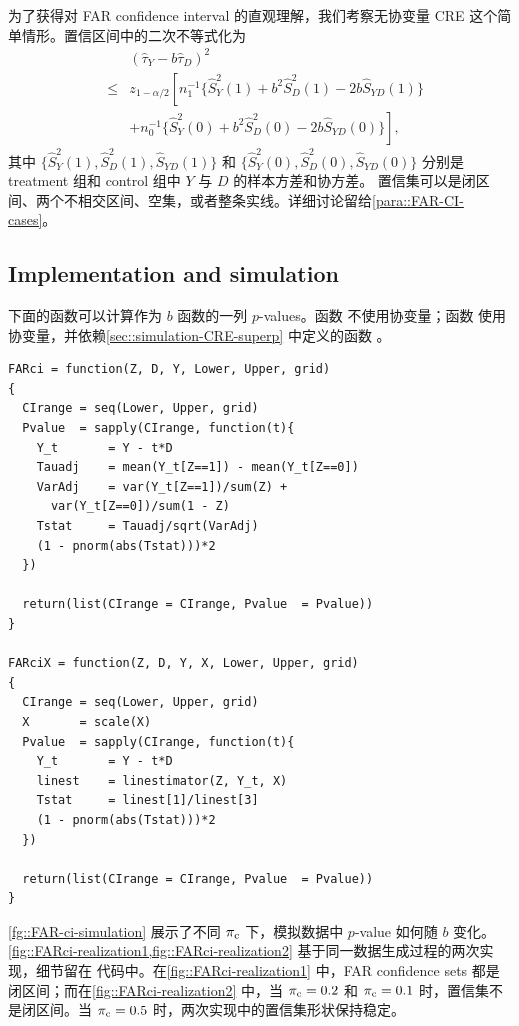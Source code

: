 \begin{example}\label{eg::FAR-CI-noX}
为了获得对 FAR confidence interval 的直观理解，我们考察无协变量 CRE 这个简单情形。置信区间中的二次不等式化为
\begin{eqnarray*}
&& (\hat{\tau}_Y  - b   \hat{\tau}_D)^2 \\ 
& \leq & z_{1-\alpha/2}
\left[      n_1^{-1} \{  \hat{S}_Y^2(1)  + b^2\hat{S}_D^2(1) - 2 b \hat{S}_{YD}(1)  \}  \right. \\
&& \left. 
 + n_0^{-1} \{  \hat{S}_Y^2(0)  + b^2\hat{S}_D^2(0) - 2 b \hat{S}_{YD}(0)  \}    \right] ,
\end{eqnarray*}
其中 $\{ \hat{S}_Y^2(1) ,  \hat{S}_D^2(1) , \hat{S}_{YD}(1)  \}$ 和 $ \{ \hat{S}_Y^2(0), \hat{S}_D^2(0),\hat{S}_{YD}(0) \} $ 分别是 treatment 组和 control 组中 $Y$ 与 $D$ 的样本方差和协方差。
置信集可以是闭区间、两个不相交区间、空集，或者整条实线。详细讨论留给\cref{para::FAR-CI-cases}。
\end{example}
 



\subsection{Implementation and simulation}\label{sec::FARci-simulation}


下面的函数可以计算作为 $b$ 函数的一列 $p$-values。函数  不使用协变量；函数  使用协变量，并依赖\cref{sec::simulation-CRE-superp} 中定义的函数 。

\begin{lstlisting}
FARci = function(Z, D, Y, Lower, Upper, grid)
{
  CIrange = seq(Lower, Upper, grid)
  Pvalue  = sapply(CIrange, function(t){
    Y_t       = Y - t*D
    Tauadj    = mean(Y_t[Z==1]) - mean(Y_t[Z==0])
    VarAdj    = var(Y_t[Z==1])/sum(Z) + 
      var(Y_t[Z==0])/sum(1 - Z)
    Tstat     = Tauadj/sqrt(VarAdj)
    (1 - pnorm(abs(Tstat)))*2
  })
  
  return(list(CIrange = CIrange, Pvalue  = Pvalue))
}

FARciX = function(Z, D, Y, X, Lower, Upper, grid)
{
  CIrange = seq(Lower, Upper, grid)
  X       = scale(X)
  Pvalue  = sapply(CIrange, function(t){
    Y_t       = Y - t*D
    linest    = linestimator(Z, Y_t, X)
    Tstat     = linest[1]/linest[3]
    (1 - pnorm(abs(Tstat)))*2
  })
  
  return(list(CIrange = CIrange, Pvalue  = Pvalue))
}
\end{lstlisting}

\cref{fg::FAR-ci-simulation} 展示了不同 $\pi_{\textup{c}}$ 下，模拟数据中 $p$-value 如何随 $b$ 变化。\cref{fig::FARci-realization1,fig::FARci-realization2} 基于同一数据生成过程的两次实现，细节留在  代码中。在\cref{fig::FARci-realization1} 中，FAR confidence sets 都是闭区间；而在\cref{fig::FARci-realization2} 中，当 $\pi_{\textup{c}} = 0.2$ 和 $\pi_{\textup{c}} = 0.1$ 时，置信集不是闭区间。当 $\pi_{\textup{c}} = 0.5$ 时，两次实现中的置信集形状保持稳定。

